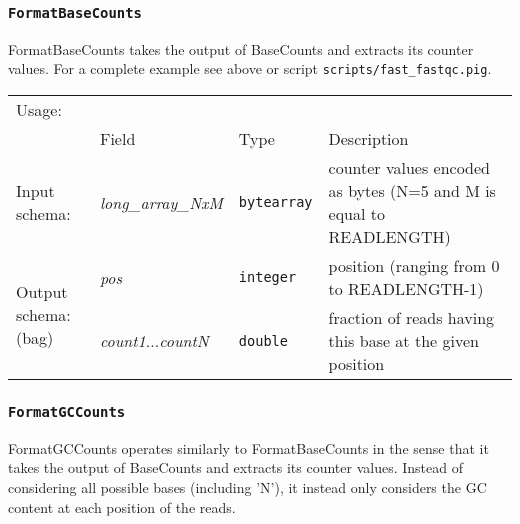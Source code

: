 \subsubsection{\texttt{FormatBaseCounts}}

FormatBaseCounts takes the output of BaseCounts and extracts its
counter values. For a complete example see above or script
\texttt{scripts/fast\_fastqc.pig}.

\begin{tabular}{lp{}p{}p{}}
Usage: & \multicolumn{3}{l}{}
\hspace*{-0.55cm}\begin{minipage}{0.85\textwidth}
  \begin{lstlisting}
  base_counts = FOREACH (GROUP read_seqs ALL) GENERATE BaseCounts($1);
  formatted_base_counts = FOREACH base_counts GENERATE FormatBaseCounts($0);
  \end{lstlisting}
  \end{minipage}\hfill\kern-\arrayrulewidth
 \\[0.25cm]
& Field & Type & Description\\[0.1cm]
Input schema: & \emph{long\_array\_NxM} & \texttt{bytearray} & counter values encoded as bytes (N=5 and M is equal to READLENGTH)\\\hline
\multirow{2}{*}{\parbox{2.2cm}{Output schema: (bag)}} & \emph{pos} & \texttt{integer} & position (ranging from 0 to READLENGTH-1)\\
& \emph{count1}$\ldots$\emph{countN} & \texttt{double} & fraction of reads having this base at the given position
\end{tabular}

\subsubsection{\texttt{FormatGCCounts}}

FormatGCCounts operates similarly to FormatBaseCounts in the sense
that it takes the output of BaseCounts and extracts its counter
values. Instead of considering all possible bases (including 'N'), it
instead only considers the GC content at each position of the reads.

